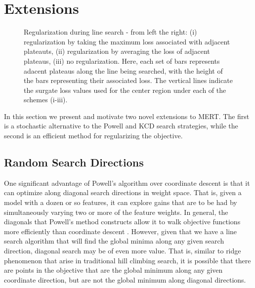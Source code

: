 \documentclass[11pt]{article}
\begin{document}
\section{Extensions}

\begin{figure*}[t]
\vskip 0.2in
\begin{center}
\setlength{\epsfxsize}{6.25in}
\centerline{}
\vskip -0.15in
\caption{Regularization during line search - from left the right: 
(i) regularization by taking the maximum loss associated with adjacent plateauts,
(ii) regularization by averaging the loss of adjacent plateaus,   
(iii) no regularization. 
Here, each set of bars represents adacent plateaus along the line being searched, with the height of the bars representing their associated loss. The vertical lines indicate the surgate loss values used for the center region under each of the schemes (i-iii). 
\label{smoothinglinesearch}
}
\end{center}
\vskip -0.2in
\end{figure*}

In this section we present and motivate two novel extensions to MERT. The first is a stochastic alternative to the Powell and KCD search strategies, while the second is an efficient method for regularizing the objective.

\subsection{Random Search Directions}

One significant advantage of Powell's algorithm over coordinate descent is that it can optimize along diagonal search directions in weight space. That is, given a model with a dozen or so features, it can explore gains that are to be had by simultaneously varying two or more of the feature weights. In general, the diagonals that Powell's method constructs allow it to walk objective functions more efficiently than coordinate descent \cite{press2007}. However, given that we have a line search algorithm that will find the global minima along any given search direction, diagonal search may be of even more value. That is, similar to ridge phenomenon that arise in traditional hill climbing search, it is possible that there are points in the objective that are the global minimum along any given coordinate direction, but are not the global minimum along diagonal directions.  
\end{document}
